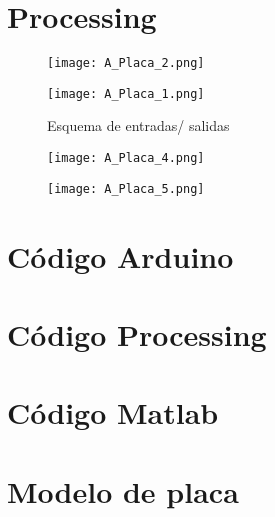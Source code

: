 \newpage
\section{Processing}
\begin{figure}[H]
	\centering
	\texttt{[image: A\_Placa\_2.png]}
\end{figure}
\begin{figure}[H]
	\centering	\texttt{[image: A\_Placa\_1.png]}
\end{figure}
\begin{figure}[H]
	\centering
	\caption{Esquema de entradas/ salidas} 
\end{figure}
\begin{figure}[H]
	\centering	\texttt{[image: A\_Placa\_4.png]}
\end{figure}	
\begin{figure}[H]
	\centering	\texttt{[image: A\_Placa\_5.png]}
\end{figure}


\newpage
\section{Código Arduino}
\newpage
\section{Código Processing}
\newpage
\section{Código Matlab}
\newpage
\section{Modelo de placa}

